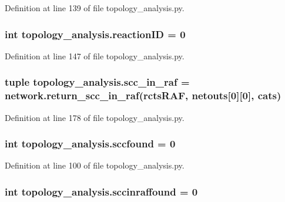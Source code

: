 Definition at line 139 of file topology\-\_\-analysis.\-py.

\hypertarget{a00157_a07d632b487fabd051ab725ee95a85368}{
\subsubsection[{reaction\-I\-D}]{\setlength{\rightskip}{0pt plus 5cm}int topology\-\_\-analysis.\-reaction\-I\-D = 0}}\label{a00157_a07d632b487fabd051ab725ee95a85368}


Definition at line 147 of file topology\-\_\-analysis.\-py.

\hypertarget{a00157_ac864e2a75b705766c1d81f68897f52c0}{
\subsubsection[{scc\-\_\-in\-\_\-raf}]{\setlength{\rightskip}{0pt plus 5cm}tuple topology\-\_\-analysis.\-scc\-\_\-in\-\_\-raf = network.\-return\-\_\-scc\-\_\-in\-\_\-raf({\bf rcts\-R\-A\-F}, {\bf netouts}\mbox{[}0\mbox{]}\mbox{[}0\mbox{]}, cats)}}\label{a00157_ac864e2a75b705766c1d81f68897f52c0}


Definition at line 178 of file topology\-\_\-analysis.\-py.

\hypertarget{a00157_aa8258ef828502be89350332ae97a0d3a}{
\subsubsection[{sccfound}]{\setlength{\rightskip}{0pt plus 5cm}int topology\-\_\-analysis.\-sccfound = 0}}\label{a00157_aa8258ef828502be89350332ae97a0d3a}


Definition at line 100 of file topology\-\_\-analysis.\-py.

\hypertarget{a00157_a3dd0e59d1fb4786b4bec44f325585eb6}{
\subsubsection[{sccinraffound}]{\setlength{\rightskip}{0pt plus 5cm}int topology\-\_\-analysis.\-sccinraffound = 0}}\label{a00157_a3dd0e59d1fb4786b4bec44f325585eb6}


